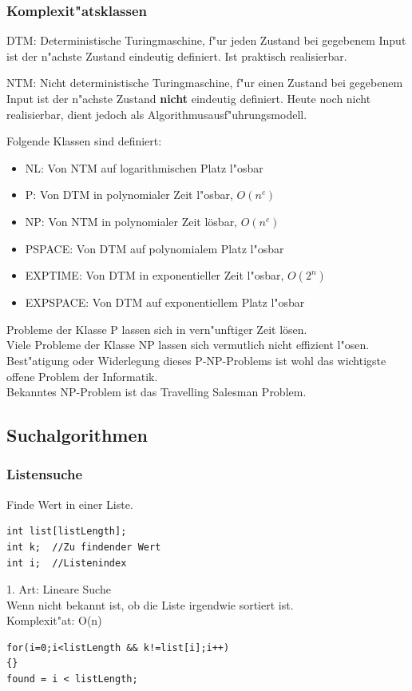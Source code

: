 \subsubsection{Komplexit"atsklassen}
DTM: Deterministische Turingmaschine, f"ur jeden Zustand bei gegebenem Input ist der n"achste Zustand eindeutig definiert. Ist praktisch realisierbar.

NTM: Nicht deterministische Turingmaschine, f"ur einen Zustand bei gegebenem Input ist der n"achste Zustand \textbf{nicht} eindeutig definiert. Heute noch nicht realisierbar, dient jedoch als Algorithmusausf"uhrungsmodell.

Folgende Klassen sind definiert:
\begin{itemize}
\item NL:       Von NTM auf logarithmischen Platz l"osbar 
\item P:        Von DTM in polynomialer Zeit l"osbar, $O(n^c)$
\item NP:       Von NTM in polynomialer Zeit lösbar, $O(n^c)$
\item PSPACE:   Von DTM auf polynomialem Platz l"osbar
\item EXPTIME:  Von DTM in exponentieller Zeit l"osbar, $O(2^n)$
\item EXPSPACE: Von DTM auf exponentiellem Platz l"osbar
\end{itemize}

Probleme der Klasse P lassen sich in vern"unftiger Zeit lösen. \\
Viele Probleme der Klasse NP lassen sich vermutlich nicht effizient l"osen.\\
Best"atigung oder Widerlegung dieses P-NP-Problems ist wohl das wichtigste offene Problem der Informatik.\\
Bekanntes NP-Problem ist das Travelling Salesman Problem.\\


\subsection{Suchalgorithmen}
\subsubsection{Listensuche}
Finde Wert in einer Liste. 
\begin{lstlisting}[style=C]
int list[listLength];
int k;	//Zu findender Wert 				
int i; 	//Listenindex
\end{lstlisting} 
1. Art: Lineare Suche\\
Wenn nicht bekannt ist, ob die Liste irgendwie sortiert ist. \\
Komplexit"at: O(n)
\begin{lstlisting}[style=C]
for(i=0;i<listLength && k!=list[i];i++)
{}
found = i < listLength; 
\end{lstlisting} 

